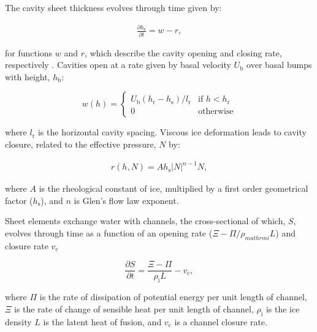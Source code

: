 \documentclass[tc, manuscript]{copernicus}
\begin{document}
The cavity sheet thickness evolves through time given by:

\begin{equation}
\label{appeqn: hs_cav}
\begin{aligned}
\frac{\partial h_{\mathrm{s}}}{\partial t} = w - r,
\end{aligned}
\end{equation}

for functions $w$ and $r$, which describe the cavity opening and closing rate, respectively \citep{kamb1987glacier,walder1994channelized}. Cavities open at a rate given by basal velocity $U_{\mathrm{b}}$ over basal bumps with height, $h_{\mathrm{b}}$:

\begin{equation}
\label{appeqn: basal sliding}
w(h) = 
	\begin{cases}
	U_{\mathrm{b}}({h_{\mathrm{r}} - h_{\mathrm{s}}})/{l_{\mathrm{r}}} & \text{if } h < h_{\mathrm{r}} \\
	0 & \text{otherwise}
	\end{cases}
\end{equation}

where $l_{\mathrm{r}}$ is the horizontal cavity spacing. Viscous ice deformation leads to cavity closure, related to the effective pressure, $N$ by:

\begin{equation}
\label{appeqn: viscous closure}
\begin{aligned}
r(h,N) = Ah_{\mathrm{s}}|N|^{n-1}N, 
\end{aligned}
\end{equation}

where $A$ is the rheological constant of ice, multiplied by a first order geometrical factor ($h_{\mathrm{s}}$), and $n$ is Glen's flow law exponent. 

Sheet elements exchange water with channels, the cross-sectional of which, $S$, evolves through time as a function of an opening rate ($\Xi - \Pi/\rho_{mathrm{i}}L$) and closure rate $v_{\mathrm{c}}$

\begin{equation}
\label{apeq:channel cross section}
\frac{\partial S}{\partial t}=\frac{\Xi-\Pi}{\rho_{\mathrm{i}} L}-v_\mathrm{c},
\end{equation}
\noindent

where $\Pi$ is the rate of dissipation of potential energy per unit length of channel, $\Xi$ is the rate of change of sensible heat per unit length of channel, $\rho_{\mathrm{i}}$ is the ice density $L$ is the latent heat of fusion, and $v_{\mathrm{c}}$ is a channel closure rate.
\end{document}
